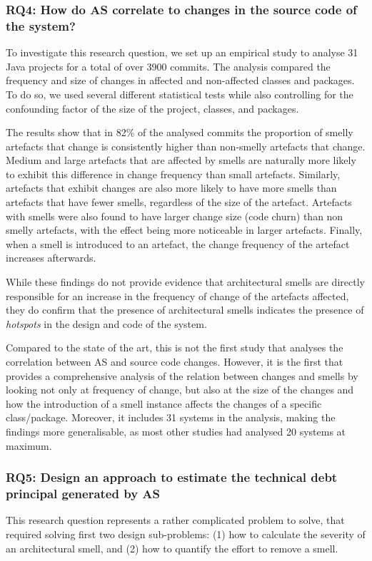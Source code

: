 \subsubsection*{RQ4: How do AS correlate to changes in the source code of the system?}
To investigate this research question, we set up an empirical study to analyse 31 Java projects for a total of over 3900 commits.
The analysis compared the frequency and size of changes in affected and non-affected classes and packages.
To do so, we used several different statistical tests while also controlling for the confounding factor of the size of the project, classes, and packages.

The results show that in 82\% of the analysed commits the proportion of smelly artefacts that change is consistently higher than non-smelly artefacts that change.
Medium and large artefacts that are affected by smells are naturally more likely to exhibit this difference in change frequency than small artefacts.
Similarly, artefacts that exhibit changes are also more likely to have more smells than artefacts that have fewer smells, regardless of the size of the artefact.
Artefacts with smells were also found to have larger change size (code churn) than non smelly artefacts, with the effect being more noticeable in larger artefacts.
Finally, when a smell is introduced to an artefact, the change frequency of the artefact increases afterwards.

While these findings do not provide evidence that architectural smells are directly responsible for an increase in the frequency of change of the artefacts affected, they do confirm that the presence of architectural smells indicates the presence of \emph{hotspots} in the design and code of the system.

Compared to the state of the art, this is not the first study that analyses the correlation between AS and source code changes. However, it is the first that provides a comprehensive analysis of the relation between changes and smells by looking not only at frequency of change, but also at the size of the changes and how the introduction of a smell instance affects the changes of a specific class/package.
Moreover, it includes 31 systems in the analysis, making the findings more generalisable, as most other studies had analysed 20 systems at maximum.

\subsubsection*{RQ5: Design an approach to estimate the technical debt principal generated by AS}
This research question represents a rather complicated problem to solve, that required solving first two design sub-problems: (1) how to calculate the severity of an architectural smell, and (2) how to quantify the effort to remove a smell.

